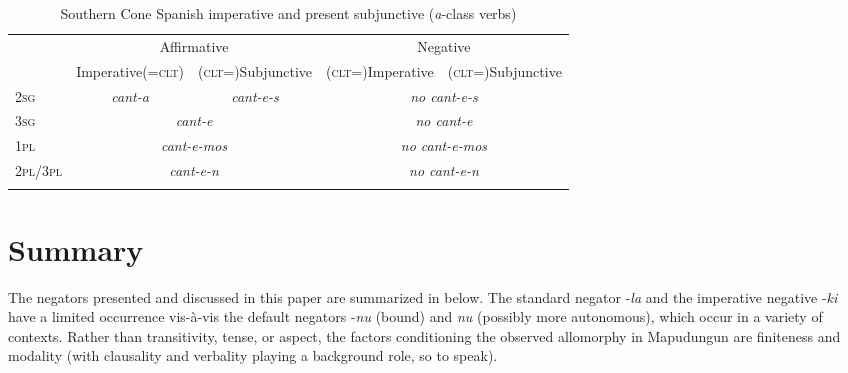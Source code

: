 \documentclass[output=paper,colorlinks,citecolor=brown,draft]{langscibook}
\begin{document}
\begin{table}
    \small
    \begin{tabularx}{\textwidth}{Xcccc}    
    \lsptoprule
    & \multicolumn{2}{c}{{Affirmative}} & \multicolumn{2}{c}{{Negative}} \\    
    \cmidrule(lr){2-3}\cmidrule(lr){4-5}
    & \multicolumn{1}{c}{{Imperative(=\textsc{clt})}} & {(\textsc{clt}=)Subjunctive} & \multicolumn{1}{c}{{(\textsc{clt}=)Imperative}} & {(\textsc{clt}=)Subjunctive}\\
    \midrule 
    {\scshape 2sg} & \textit{cant-a} & \textit{cant-e-s} & \multicolumn{2}{c}{\textit{no cant-e-s}} \\
    {\scshape 3sg} & \multicolumn{2}{c}{\textit{cant-e}} & \multicolumn{2}{c}{\textit{no cant-e}} \\
    {\scshape 1pl} & \multicolumn{2}{c}{\textit{cant-e-mos}} & \multicolumn{2}{c}{\textit{no cant-e-mos}} \\
    {\scshape 2pl/3pl} & \multicolumn{2}{c}{\textit{cant-e-n}} & \multicolumn{2}{c}{\textit{no cant-e-n}} \\
    \lspbottomrule
    \end{tabularx}
    \caption{Southern Cone Spanish imperative and present subjunctive (\textit{a}{}-class verbs)}
    \label{tab:mapu:4}
\end{table}

\section{Summary}
\label{sec:mapu:5}

The negators presented and discussed in this paper are summarized in  below. The standard negator \nobreakdash-\textit{la} and the imperative negative \nobreakdash-\textit{ki} have a limited occurrence vis-à-vis the default negators \nobreakdash-\textit{nu} (bound) and \textit{nu} (possibly more autonomous), which occur in a variety of contexts. Rather than transitivity, tense, or aspect, the factors conditioning the observed allomorphy in Mapudungun are finiteness and modality (with clausality and verbality playing a background role, so to speak).
\end{document}
